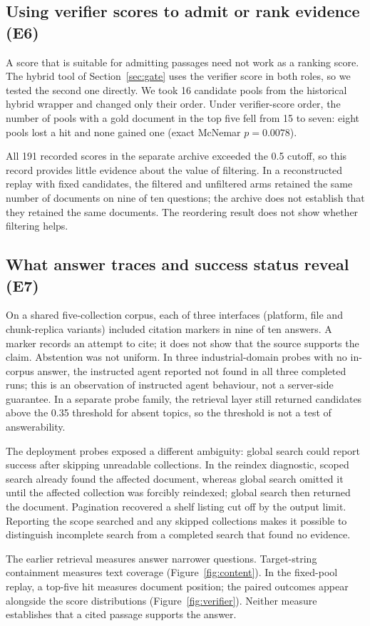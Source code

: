 \subsection{Using verifier scores to admit or rank evidence (E6)}
\label{sec:e6}
\label{sec:inflation}\label{sec:eval-verify}\label{sec:exp-e6}
A score that is suitable for admitting passages need not work as a ranking
score. The hybrid tool of Section~\ref{sec:gate} uses the verifier score in
both roles, so we tested the second one directly. We took 16 candidate pools
from the historical hybrid wrapper and changed only their order. Under
verifier-score order, the number of pools with a gold document in the top
five fell from 15 to seven: eight pools lost a hit and none gained one
(exact McNemar $p=0.0078$).

All 191 recorded scores in the separate archive exceeded the 0.5 cutoff,
so this record provides little evidence about the value of filtering. In a
reconstructed replay with fixed candidates, the filtered and unfiltered arms
retained the same number of documents on nine of ten questions; the archive
does not establish that they retained the same documents. The reordering
result does not show whether filtering helps.

\subsection{What answer traces and success status reveal (E7)}
\label{sec:e5}
\label{sec:agentic}\label{sec:abstention}\label{sec:composition}\label{sec:eval-agent}
\label{sec:sysarms}\label{sec:e7}\label{sec:exp-e7}
On a shared five-collection corpus, each of three interfaces (platform, file
and chunk-replica variants) included citation markers in nine of ten answers. A marker records an attempt to
cite; it does not show that the source supports the claim. Abstention was
not uniform. In three industrial-domain probes with no in-corpus answer, the
instructed agent reported not found in all three completed runs; this is an
observation of instructed agent behaviour, not a server-side guarantee. In a
separate probe family, the retrieval layer still returned candidates above
the 0.35 threshold for absent topics, so the threshold is not a test of
answerability.

The deployment probes exposed a different ambiguity: global search could
report success after skipping unreadable collections. In the reindex
diagnostic, scoped search already found the affected document, whereas
global search omitted it until the affected collection was forcibly
reindexed; global search then returned the document. Pagination recovered a
shelf listing cut off by the output limit. Reporting the scope searched and
any skipped collections makes it possible to distinguish incomplete search
from a completed search that found no evidence.

The earlier retrieval measures answer narrower questions. Target-string
containment measures text coverage (Figure~\ref{fig:content}). In the
fixed-pool replay, a top-five hit measures document position; the paired
outcomes appear alongside the score distributions (Figure~\ref{fig:verifier}).
Neither measure establishes that a cited passage supports the answer.
